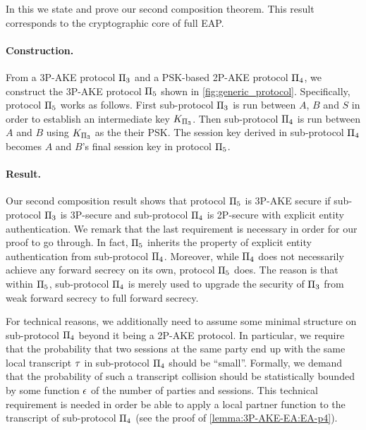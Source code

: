 In this  we state and prove our second composition theorem.
This result corresponds to the cryptographic core of full EAP.


\paragraph{Construction.}\label{sec:construction:PI_5}


From a 3P-AKE protocol $\mathrm{\Pi}_3$ and a PSK-based 2P-AKE protocol $\mathrm{\Pi}_4$,
we construct the 3P-AKE protocol $\mathrm{\Pi}_5$ shown in \cref{fig:generic_protocol}.
Specifically,
protocol $\mathrm{\Pi}_5$ works as follows.
First sub-protocol $\mathrm{\Pi}_3$ is run between $A$, $B$ and $S$ in order to establish an intermediate key $K_{\mathrm{\Pi}_3}$.
Then sub-protocol $\mathrm{\Pi}_4$ is run between $A$ and $B$ using $K_{\mathrm{\Pi}_3}$ as the their PSK.
The session key derived in sub-protocol $\mathrm{\Pi}_4$ becomes $A$ and $B$'s final session key in protocol $\mathrm{\Pi}_5$.






\paragraph{Result.}
Our second composition result shows that protocol $\mathrm{\Pi}_5$ is 3P-AKE secure 
if sub-protocol $\mathrm{\Pi}_3$ is 3P-\akewfstext  secure and sub-protocol $\mathrm{\Pi}_4$ is 2P-\akenfstext secure with  explicit entity authentication. 
We remark that the last requirement is necessary in order for our proof to go through.
In fact,
$\mathrm{\Pi}_5$ inherits the property of explicit entity authentication from sub-protocol $\mathrm{\Pi}_4$.
Moreover,
while $\mathrm{\Pi}_4$ does not necessarily achieve any forward secrecy on its own,
protocol $\mathrm{\Pi}_5$ does.
The reason is that within $\mathrm{\Pi}_5$, 
sub-protocol $\mathrm{\Pi}_4$ is merely used to upgrade the security of $\mathrm{\Pi}_3$ from weak forward secrecy to full forward secrecy.

For technical reasons,
we additionally need to assume some minimal structure on sub-protocol $\mathrm{\Pi}_4$ beyond it being a 2P-AKE protocol.
In particular,
we require that the probability that two sessions at the same party end up with the same local transcript $\tau$ in sub-protocol $\mathrm{\Pi}_4$ should be ``small''.
Formally,
we demand that the probability of such a transcript collision should be statistically bounded by some function $\epsilon$ of the number of parties and sessions. 
This technical requirement is needed in order be able to apply a local partner function to the transcript of sub-protocol $\mathrm{\Pi}_4$
(see the proof of \cref{lemma:3P-AKE-EA:EA-p4}).

